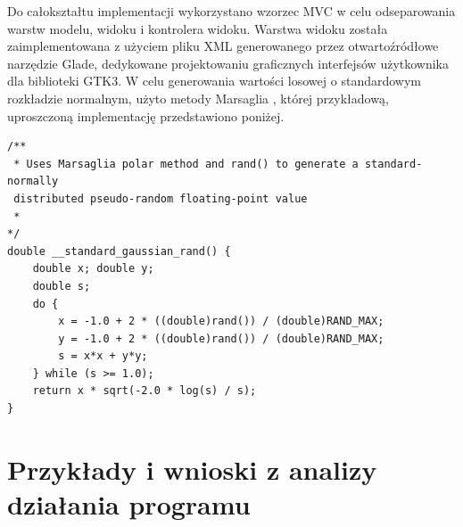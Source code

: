 \documentclass{article}
\begin{document}
Do całokształtu implementacji wykorzystano wzorzec MVC w celu odseparowania warstw modelu, widoku i kontrolera widoku. Warstwa widoku została zaimplementowana z użyciem pliku XML generowanego przez otwartoźródłowe narzędzie Glade, dedykowane projektowaniu graficznych interfejsów użytkownika dla biblioteki GTK3. 
W celu generowania wartości losowej o standardowym rozkładzie normalnym, użyto metody Marsaglia \cite{marsaglia_method_link}, której przykładową, uproszczoną implementację przedstawiono poniżej.
\begin{verbatim}
/**
 * Uses Marsaglia polar method and rand() to generate a standard-normally 
 distributed pseudo-random floating-point value
 * 
*/
double __standard_gaussian_rand() {
    double x; double y; 
    double s;
    do {
        x = -1.0 + 2 * ((double)rand()) / (double)RAND_MAX;
        y = -1.0 + 2 * ((double)rand()) / (double)RAND_MAX;
        s = x*x + y*y;
    } while (s >= 1.0);
    return x * sqrt(-2.0 * log(s) / s);
}
\end{verbatim}

\newpage
\section{Przykłady i wnioski z analizy działania programu}
\end{document}
